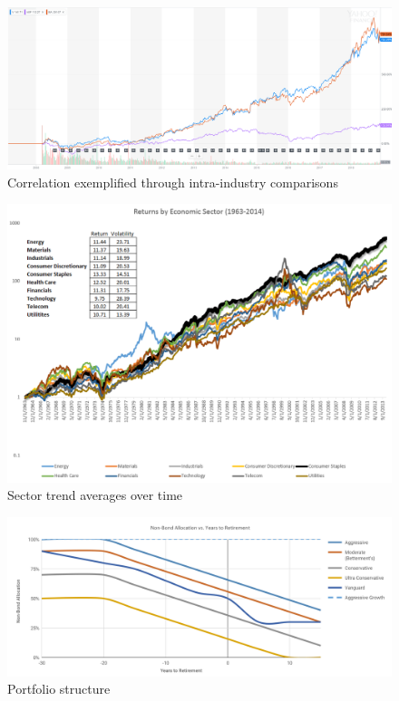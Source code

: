 \documentclass{article}
\begin{document}
\clearpage
\vspace*{1in}

\begin{figure}[!htb]
    \centering
    \includegraphics[width=\textwidth]{imgs/98.png}
    \caption{Correlation exemplified through intra-industry comparisons}
\end{figure}

\vspace{10pt}

\begin{figure}[!htb]
    \centering
    \includegraphics[width=\textwidth]{imgs/99.png}
    \caption{Sector trend averages over time}
\end{figure}

\vspace{10pt}

\begin{figure}[!htb]
    \centering
    \includegraphics[width=\textwidth]{imgs/100.png}
    \caption{Portfolio structure}
\end{figure}
\end{document}
